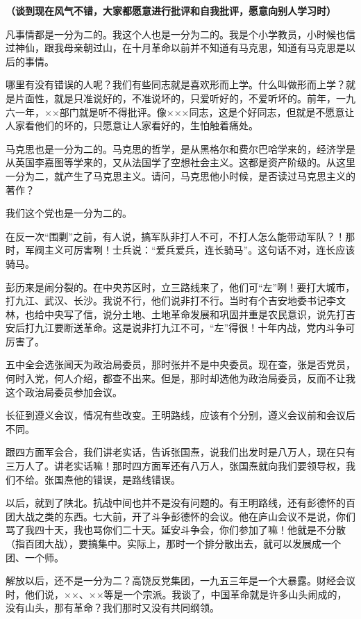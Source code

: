 \textbf{（谈到现在风气不错，大家都愿意进行批评和自我批评，愿意向别人学习时）}

凡事情都是一分为二的。我这个人也是一分为二的。我是个小学教员，小时候也信过神仙，跟我母亲朝过山，在十月革命以前并不知道有马克思，知道有马克思是以后的事情。

哪里有没有错误的人呢？我们有些同志就是喜欢形而上学。什么叫做形而上学？就是片面性，就是只准说好的，不准说坏的，只爱听好的，不爱听坏的。前年，一九六一年，××部门就是听不得批评。像×××同志，这是个好同志，但就是不愿意让人家看他们的坏的，只愿意让人家看好的，生怕触着痛处。

马克思也是一分为二的。马克思的哲学，是从黑格尔和费尔巴哈学来的，经济学是从英国李嘉图等学来的，又从法国学了空想社会主义。这都是资产阶级的。从这里一分为二，就产生了马克思主义。请问，马克思他小时候，是否读过马克思主义的著作？

我们这个党也是一分为二的。

在反一次“围剿”之前，有人说，搞军队非打人不可，不打人怎么能带动军队？！那时，军阀主义可厉害咧！士兵说：“爱兵爱兵，连长骑马”。这句话不对，连长应该骑马。

彭历来是闹分裂的。在中央苏区时，立三路线来了，他们可“左”咧！要打大城市，打九江、武汉、长沙。我说不行，他们说非打不行。当时有个吉安地委书记李文林，也给中央写了信，说分土地、土地革命发展和巩固并重是农民意识，说先打吉安后打九江要断送革命。这是说非打九江不可，“左”得很！十年内战，党内斗争可厉害了。

五中全会选张闻天为政治局委员，那时张并不是中央委员。现在查，张是否党员，何时入党，何人介绍，都查不出来。但是，那时却选他为政治局委员，反而不让我这个政治局委员参加会议。

长征到遵义会议，情况有些改变。王明路线，应该有个分别，遵义会议前和会议后不同。

跟四方面军会合，我们讲老实话，告诉张国焘，说我们出发时是八万人，现在只有三万人了。讲老实话嘛！那时四方面军还有八万人，张国焘就向我们要领导权，我们不给。张国焘他的错误，是路线错误。

以后，就到了陕北。抗战中间也并不是没有问题的。有王明路线，还有彭德怀的百团大战之类的东西。七大前，开了斗争彭德怀的会议。他在庐山会议不是说，你们骂了我四十天，我也骂你们二十天。延安斗争会，你们参加了嘛！他就是不分散（指百团大战），要搞集中。实际上，那时一个排分散出去，就可以发展成一个团、一个师。

解放以后，还不是一分为二？高饶反党集团，一九五三年是一个大暴露。财经会议时，他们说，××、××等是一个宗派。我谈了，中国革命就是许多山头闹成的，没有山头，那有革命？我们那时又没有共同纲领。

